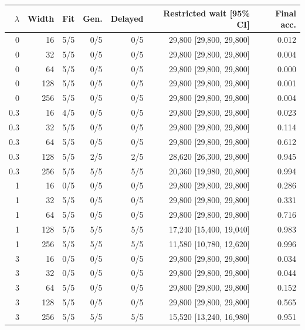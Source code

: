 \begin{tabular}{rr rrr r r}
\toprule
$\lambda$ & Width & Fit & Gen. & Delayed & Restricted wait [95\% CI] & Final acc. \\
\midrule
0 & 16 & 5/5 & 0/5 & 0/5 & 29,800 [29,800, 29,800] & 0.012 \\
0 & 32 & 5/5 & 0/5 & 0/5 & 29,800 [29,800, 29,800] & 0.004 \\
0 & 64 & 5/5 & 0/5 & 0/5 & 29,800 [29,800, 29,800] & 0.000 \\
0 & 128 & 5/5 & 0/5 & 0/5 & 29,800 [29,800, 29,800] & 0.001 \\
0 & 256 & 5/5 & 0/5 & 0/5 & 29,800 [29,800, 29,800] & 0.004 \\
\midrule
0.3 & 16 & 4/5 & 0/5 & 0/5 & 29,800 [29,800, 29,800] & 0.023 \\
0.3 & 32 & 5/5 & 0/5 & 0/5 & 29,800 [29,800, 29,800] & 0.114 \\
0.3 & 64 & 5/5 & 0/5 & 0/5 & 29,800 [29,800, 29,800] & 0.612 \\
0.3 & 128 & 5/5 & 2/5 & 2/5 & 28,620 [26,300, 29,800] & 0.945 \\
0.3 & 256 & 5/5 & 5/5 & 5/5 & 20,360 [19,980, 20,800] & 0.994 \\
\midrule
1 & 16 & 0/5 & 0/5 & 0/5 & 29,800 [29,800, 29,800] & 0.286 \\
1 & 32 & 5/5 & 0/5 & 0/5 & 29,800 [29,800, 29,800] & 0.331 \\
1 & 64 & 5/5 & 0/5 & 0/5 & 29,800 [29,800, 29,800] & 0.716 \\
1 & 128 & 5/5 & 5/5 & 5/5 & 17,240 [15,400, 19,040] & 0.983 \\
1 & 256 & 5/5 & 5/5 & 5/5 & 11,580 [10,780, 12,620] & 0.996 \\
\midrule
3 & 16 & 0/5 & 0/5 & 0/5 & 29,800 [29,800, 29,800] & 0.034 \\
3 & 32 & 0/5 & 0/5 & 0/5 & 29,800 [29,800, 29,800] & 0.044 \\
3 & 64 & 5/5 & 0/5 & 0/5 & 29,800 [29,800, 29,800] & 0.152 \\
3 & 128 & 5/5 & 0/5 & 0/5 & 29,800 [29,800, 29,800] & 0.565 \\
3 & 256 & 5/5 & 5/5 & 5/5 & 15,520 [13,240, 16,980] & 0.951 \\
\bottomrule
\end{tabular}